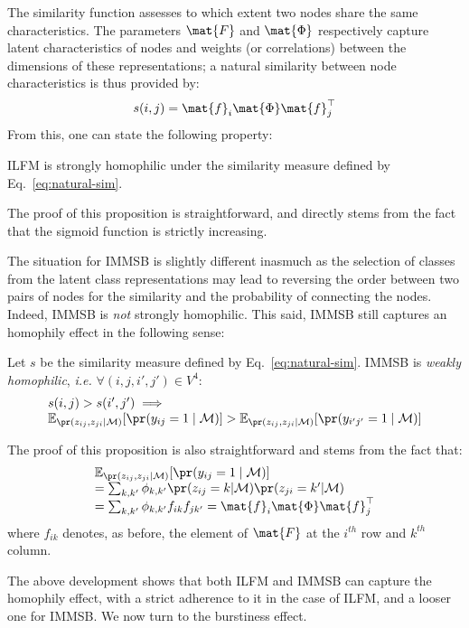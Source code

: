 The similarity function assesses to which extent two nodes share the same characteristics. The parameters $\mat{F}$ and $\mat{\Phi}$ respectively capture latent characteristics of nodes and weights (or correlations) between the dimensions of these representations; a natural similarity between node characteristics is thus provided by:
%
\begin{equation}
s(i,j) = \mat{f}_{i} \mat{\Phi} \mat{f}_j^\top
\label{eq:natural-sim}
\end{equation}
%
From this, one can state the following property:
%
\begin{proposition}[]
ILFM is strongly homophilic under the similarity measure defined by Eq.~\ref{eq:natural-sim}.
\end{proposition}
%
\noindent The proof of this proposition is straightforward, and directly stems from the fact that the sigmoid function is strictly increasing.

The situation for IMMSB is slightly different inasmuch as the selection of classes from the latent class representations may lead to reversing the order between two pairs of nodes for the similarity and the probability of connecting the nodes. Indeed, IMMSB is \textit{not} strongly homophilic. This said, IMMSB still captures an homophily effect in the following sense:
%
\begin{proposition}[]
Let $s$ be the similarity measure defined by Eq.~\ref{eq:natural-sim}. IMMSB is \emph{weakly homophilic}, \textit{i.e.}  $\forall (i,j,i',j') \in V^4$:
%
\begin{equation}
\begin{array}{l}
s(i,j) > s(i',j')  \implies \nonumber \\
\mathbb{E}_{\pr(z_{ij},z_{ji}|\mathcal{M})}[\pr(y_{ij}=1 \mid \mathcal{M})] > \mathbb{E}_{\pr(z_{ij},z_{ji}|\mathcal{M})}[\pr(y_{i'j'}=1  \mid \mathcal{M})] \nonumber
\end{array}
\end{equation}
\end{proposition}
%
\noindent The proof of this proposition is also straightforward and stems from the fact that:
%
\begin{equation}
\begin{array}{l}
\mathbb{E}_{\pr(z_{ij},z_{ji}|\mathcal{M})}[\pr(y_{ij}=1 \mid \mathcal{M})]\nonumber \\
= \sum_{k,k'} \phi_{k,k'} \pr(z_{ij}=k|\mathcal{M}) \pr(z_{ji}=k'|\mathcal{M}) \nonumber \\
= \sum_{k,k'} \phi_{k,k'} f_{ik} f_{jk'} = \mat{f}_i \mat{\Phi} \mat{f}_j^\top \nonumber
\end{array}
\end{equation}
%
where $f_{ik}$ denotes, as before, the element of $\mat{F}$ at the $i^{th}$ row and $k^{th}$ column. 

The above development shows that both ILFM and IMMSB can capture the homophily effect, with a strict adherence to it in the case of ILFM, and a looser one for IMMSB. We now turn to the burstiness effect.